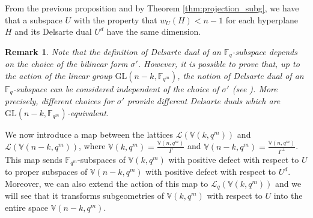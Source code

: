 \documentclass[11pt]{amsart}
\newtheorem{remark}[theorem]{Remark}
\newcommand{\fqm}{\mathbb{F}_{q^m}}
\newcommand{\F}{{\mathbb F}}
\newcommand{\fq}{{\mathbb F}_{q}}
\begin{document}
From the previous proposition and by Theorem \ref{thm:projection_subg}, we have that a subspace $U$ with the property that $w_{U}(H)< n-1$ for each hyperplane $H$ and its Delsarte dual $U^d$ have the same dimension.

\begin{remark}
    Note that the definition of  Delsarte dual of an $\fq$-subspace depends on the choice of the bilinear form $\sigma'$. However, it is possible to prove that, up to the action of the linear group $\mathrm{GL}(n-k,\fqm)$, the notion of Delsarte dual of an $\fq$-subspace can be considered independent of the choice of $\sigma'$ (see \cite[Remark 3.7]{csajbok2021generalising}).
    More precisely,  different choices for $\sigma'$ provide different Delsarte duals which are $\mathrm{GL}(n-k,\fqm)$-equivalent.
    \end{remark}


We now introduce a map between the lattices $\mathcal{L}(\mathbb{V}(k,q^m))$ and $\mathcal{L}(\mathbb{V}(n-k,q^m))$, where $\mathbb{V}(k,q^m)=\frac{\mathbb{V}(n,q^m)}{\Gamma}$ and $\mathbb{V}(n-k,q^m)=\frac{\mathbb{V}(n,q^m)}{\Gamma^\perp}$. 
This map sends $\F_{q^m}$-subspaces of $\mathbb{V}(k,q^m)$ with positive defect with respect to $U$ to proper subspaces of $\mathbb{V}(n-k,q^m)$ with positive defect with respect to $U^d$.
Moreover, we can also extend the action of this map to $\mathcal{L}_q(\mathbb{V}(k,q^m))$ and we will see that it transforms subgeometries of $\mathbb{V}(k,q^m)$ with respect to $U$ into the entire space $\mathbb{V}(n-k,q^m)$.
\end{document}
